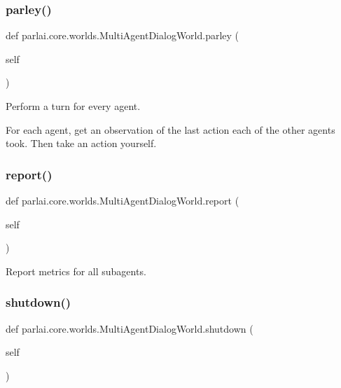 \subsubsection{\texorpdfstring{parley()}{parley()}}
{\footnotesize\ttfamily def parlai.\+core.\+worlds.\+Multi\+Agent\+Dialog\+World.\+parley (\begin{DoxyParamCaption}\item[{}]{self }\end{DoxyParamCaption})}

\begin{DoxyVerb}Perform a turn for every agent.

For each agent, get an observation of the last action each of the other agents
took. Then take an action yourself.
\end{DoxyVerb}
 \mbox{\label{classparlai_1_1core_1_1worlds_1_1MultiAgentDialogWorld_a686b237998ede0e9431dd58bca2b34c1}} 
\subsubsection{\texorpdfstring{report()}{report()}}
{\footnotesize\ttfamily def parlai.\+core.\+worlds.\+Multi\+Agent\+Dialog\+World.\+report (\begin{DoxyParamCaption}\item[{}]{self }\end{DoxyParamCaption})}

\begin{DoxyVerb}Report metrics for all subagents.
\end{DoxyVerb}
 \mbox{\label{classparlai_1_1core_1_1worlds_1_1MultiAgentDialogWorld_a02b4cbd9d41fde087fb4f0b11d6479a5}} 
\subsubsection{\texorpdfstring{shutdown()}{shutdown()}}
{\footnotesize\ttfamily def parlai.\+core.\+worlds.\+Multi\+Agent\+Dialog\+World.\+shutdown (\begin{DoxyParamCaption}\item[{}]{self }\end{DoxyParamCaption})}

